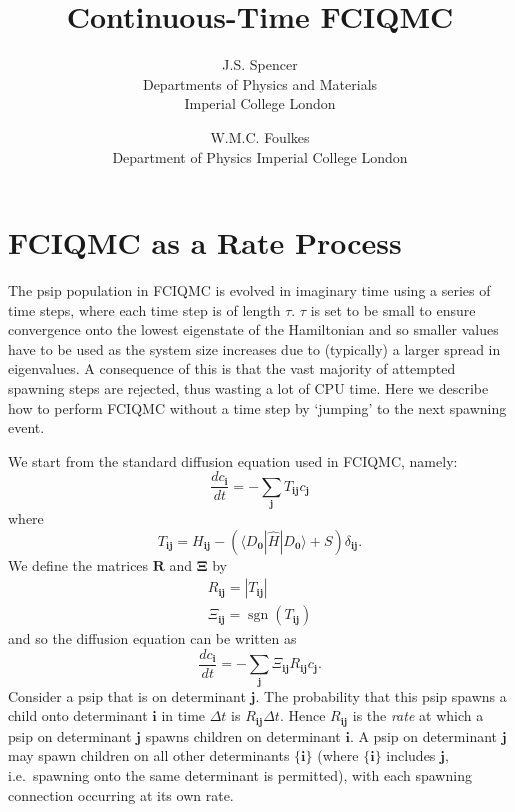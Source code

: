\documentclass[a4paper, 11pt]{article}
\newcommand{\bi}{\mathbf{i}}
\newcommand{\bj}{\mathbf{j}}
\newcommand{\bz}{\mathbf{0}}
\newcommand{\bra}{\langle}
\newcommand{\ket}{\rangle}
\newcommand{\dd}[2]{\frac{d#1}{d#2}}
\newcommand{\Hamil}{\hat{H}}
\newcommand{\sgn}{\operatorname{sgn}}
\begin{document}
\title{Continuous-Time FCIQMC}
\author{J.S. Spencer\\
  Departments of Physics and Materials\\
  Imperial College London 
  \and W.M.C. Foulkes\\
  Department of Physics
  Imperial College London}

\maketitle

\section*{FCIQMC as a Rate Process}

The psip population in FCIQMC is evolved in imaginary time using a series of time steps, where each time step is of length $\tau$.  $\tau$ is set to be small to ensure convergence onto the lowest eigenstate of the Hamiltonian and so smaller values have to be used as the system size increases due to (typically) a larger spread in eigenvalues.  A consequence of this is that the vast majority of attempted spawning steps are rejected, thus wasting a lot of CPU time.  Here we describe how to perform FCIQMC without a time step by `jumping' to the next spawning event.

We start from the standard diffusion equation used in FCIQMC, namely:
\begin{equation}
\dd{c_\bi}{t} = - \sum_\bj T_{\bi\bj} c_\bj
\end{equation}
where
\begin{equation}
T_{\bi\bj} = H_{\bi\bj} - (\bra D_\bz | \Hamil | D_\bz \ket + S)\delta_{\bi\bj}.
\end{equation}
We define the matrices $\mathbf{R}$ and $\boldsymbol{\Xi}$ by
\begin{gather}
R_{\bi\bj} = |T_{\bi\bj}| \\
\Xi_{\bi\bj} = \sgn(T_{\bi\bj})
\end{gather}
and so the diffusion equation can be written as
\begin{equation}
\dd{c_\bi}{t} = - \sum_\bj \Xi_{\bi\bj} R_{\bi\bj} c_\bj.
\end{equation}
Consider a psip that is on determinant $\bj$.  The probability that this psip spawns a child onto determinant $\bi$ in time $\Delta t$ is $R_{\bi\bj}\Delta t$.  Hence $R_{\bi\bj}$ is the \emph{rate} at which a psip on determinant $\bj$ spawns children on determinant $\bi$.  A psip on determinant $\bj$ may spawn children on all other determinants $\{\bi\}$ (where $\{\bi\}$ includes $\bj$, i.e.\ spawning onto the same determinant is permitted), with each spawning connection occurring at its own rate.
\end{document}
